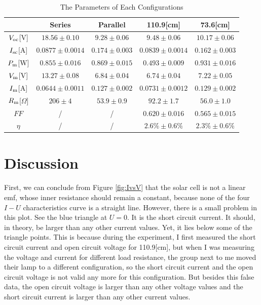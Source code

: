 \documentclass[a4paper]{article}
\newcommand{\V}{{V_{\rm oc}}}
\newcommand{\I}{{I_{\rm sc}}}
\begin{document}
    \begin{table}[!ht]
        \centering
        \begin{tabular}{|c|c|c|c|c|}
            \hline
            &Series&Parallel&110.9[cm]&73.6[cm]\\\hline
            $\V$[V]&$18.56\pm 0.10$&$9.28\pm 0.06$&$9.48\pm 0.06$&$10.17\pm 0.06$\\\hline
            $\I$[A]&$0.0877\pm 0.0014$&$0.174\pm 0.003$&$0.0839\pm 0.0014$&$0.162\pm 0.003$\\\hline
            $P_{\rm m}$[W]&$0.855\pm 0.016$&$0.869\pm 0.015$&$0.493\pm 0.009$&$0.931\pm 0.016$\\\hline
            $V_{\rm m}$[V]&$13.27 \pm 0.08$&$6.84\pm 0.04$&$6.74\pm 0.04$&$7.22\pm 0.05$\\\hline
            $I_{\rm m}$[A]&$0.0644\pm 0.0011$&$0.127\pm 0.002$&$0.0731\pm 0.0012$&$0.129\pm 0.002$\\\hline
            $R_{\rm m}$[$\Omega$]&$206\pm 4$&$53.9\pm 0.9$&$92.2\pm 1.7$&$56.0\pm 1.0$\\\hline
            $FF$&/&/&$0.620\pm 0.016$&$0.565\pm 0.015$\\\hline
            $\eta$&/&/&$2.6\%\pm 0.6\%$&$2.3\%\pm 0.6\%$\\\hline
        \end{tabular}
        \caption{The Parameters of Each Configurations}
        \label{tab:parameter}
    \end{table}
    \section{Discussion}
    \paragraph{} First, we can conclude from Figure \ref{fig:IvsV} that the solar cell is not a linear emf, whose inner resistance should remain a constant, because none of the four $I-U$ characteristics curve is a straight line. However, there is a small problem in this plot. See the blue triangle at $U=0$. It is the short circuit current. It should, in theory, be larger than any other current values. Yet, it lies below some of the triangle points. This is because during the experiment, I first measured the short circuit current and open circuit voltage for 110.9[cm], but when I was measuring the voltage and current for different load resistance, the group next to me moved their lamp to a different configuration, so the short circuit current and the open circuit voltage is not valid any more for this configuration. But besides this false data, the open circuit voltage is larger than any other voltage values and the short circuit current is larger than any other current values. 
    \vspace{-5mm}
\end{document}
